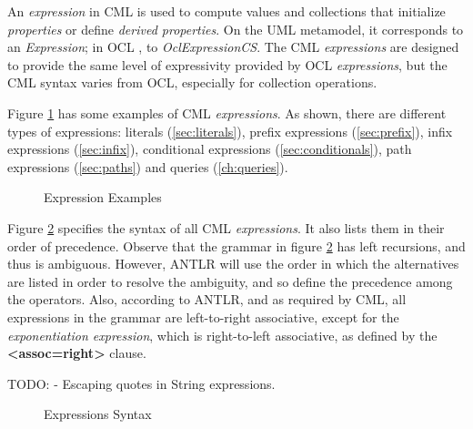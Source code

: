 \begin{definition}
An \emph{expression} in CML is used to compute values and collections that initialize \emph{properties} or define \emph{derived properties}.
On the UML \cite{uml} metamodel,
it corresponds to an \emph{Expression};
in OCL \cite{ocl}, to \emph{OclExpressionCS}.
The CML \emph{expressions} are designed to provide the same level of
expressivity provided by OCL \emph{expressions},
but the CML syntax varies from OCL, especially for collection operations.
\end{definition}

\begin{examples}
Figure \ref{fig:ex:expressions} has some examples of CML \emph{expressions}.
As shown, there are different types of expressions:
literals (\ref{sec:literals}),
prefix expressions (\ref{sec:prefix}),
infix expressions (\ref{sec:infix}),
conditional expressions (\ref{sec:conditionals}),
path expressions (\ref{sec:paths})
and queries (\ref{ch:queries}).
\end{examples}

\begin{figure}
\verbatimfont{\small}

\caption{Expression Examples}
\label{fig:ex:expressions}
\end{figure}

\begin{concrete-syntax}
Figure \ref{fig:stx:expressions} specifies the syntax of all CML \emph{expressions}. It also lists them in their order of precedence.
Observe that the grammar in figure \ref{fig:stx:expressions} has left
recursions, and thus is ambiguous.
However, ANTLR \cite{antlr} will use the order in which the alternatives
are listed in order to resolve the ambiguity,
and so define the precedence among the operators.
Also, according to ANTLR,
and as required by CML,
all expressions in the grammar are left-to-right associative,
except for the \emph{exponentiation expression},
which is right-to-left associative,
as defined by the \textbf{<assoc=right>} clause.
\end{concrete-syntax}

TODO:
- Escaping quotes in String expressions.

\begin{figure}
\verbatimfont{\small}

\caption{Expressions Syntax}
\label{fig:stx:expressions}
\end{figure}
